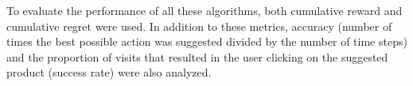 \documentclass[../main.tex]{subfiles}
\begin{document}
To evaluate the performance of all these algorithms, both cumulative reward and cumulative regret were used. 
In addition to these metrics, accuracy (number of times the best possible action was suggested divided by the 
number of time steps) and the proportion of visits that resulted in the user clicking on the suggested product 
(success rate) were also analyzed.  
\end{document}

